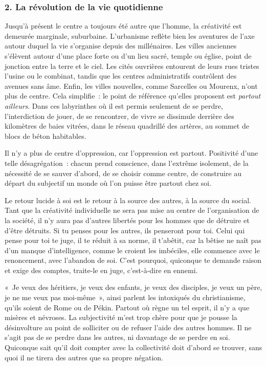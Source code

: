 \documentclass[french,twoside]{book} %
\begin{document}
\subsubsection[{2. La révolution de la vie quotidienne}]{\textsc{2.} La révolution de la vie quotidienne}
\noindent Jusqu’à présent le centre a toujours été autre que l’homme, la créativité est demeurée marginale, suburbaine. L’urbanisme reflète bien les aventures de l’axe autour duquel la vie s’organise depuis des millénaires. Les villes anciennes s’élèvent autour d’une place forte ou d’un lieu sacré, temple ou église, point de jonction entre la terre et le ciel. Les cités ouvrières entourent de leurs rues tristes l’usine ou le combinat, tandis que les centres administratifs contrôlent des avenues sans âme. Enfin, les villes nouvelles, comme Sarcelles ou Mourenx, n’ont plus de centre. Cela simplifie : le point de référence qu’elles proposent est \emph{partout ailleurs}. Dans ces labyrinthes où il est permis seulement de se perdre, l’interdiction de jouer, de se rencontrer, de vivre se dissimule derrière des kilomètres de baies vitrées, dans le réseau quadrillé des artères, au sommet de blocs de béton habitables.\par
Il n’y a plus de centre d’oppression, car l’oppression est partout. Positivité d’une telle désagrégation : chacun prend conscience, dans l’extrême isolement, de la nécessité de se sauver d’abord, de se choisir comme centre, de construire au départ du subjectif un monde où l’on puisse être partout chez soi.\par
Le retour lucide à soi est le retour à la source des autres, à la source du social. Tant que la créativité individuelle ne sera pas mise au centre de l’organisation de la société, il n’y aura pas d’autres libertés pour les hommes que de détruire et d’être détruits. Si tu penses pour les autres, ils penseront pour toi. Celui qui pense pour toi te juge, il te réduit à sa norme, il t’abêtit, car la bêtise ne naît pas d’un manque d’intelligence, comme le croient les imbéciles, elle commence avec le renoncement, avec l’abandon de soi. C’est pourquoi, quiconque te demande raison et exige des comptes, traite-le en juge, c’est-à-dire en ennemi.\par
« Je veux des héritiers, je veux des enfants, je veux des disciples, je veux un père, je ne me veux pas moi-même », ainsi parlent les intoxiqués du christianisme, qu’ils soient de Rome ou de Pékin. Partout où règne un tel esprit, il n’y a que misères et névroses. La subjectivité m’est trop chère pour que je pousse la désinvolture au point de solliciter ou de refuser l’aide des autres hommes. Il ne s’agit pas de se perdre dans les autres, ni davantage de se perdre en soi. Quiconque sait qu’il doit compter avec la collectivité doit d’abord se trouver, sans quoi il ne tirera des autres que sa propre négation.\par
\end{document}
